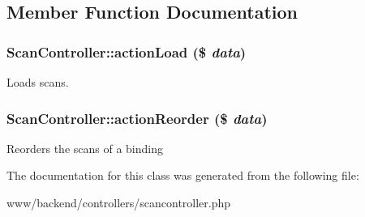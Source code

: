 \subsection{Member Function Documentation}
\hypertarget{classScanController_a5df6553a577a96b4afb65dd2f52464e9}{
\subsubsection[{actionLoad}]{\setlength{\rightskip}{0pt plus 5cm}ScanController::actionLoad (\$ {\em data})}}
\label{classScanController_a5df6553a577a96b4afb65dd2f52464e9}
Loads scans. \hypertarget{classScanController_a5e4ead751c616143ac51fd6dff807c24}{
\subsubsection[{actionReorder}]{\setlength{\rightskip}{0pt plus 5cm}ScanController::actionReorder (\$ {\em data})}}
\label{classScanController_a5e4ead751c616143ac51fd6dff807c24}
Reorders the scans of a binding 

The documentation for this class was generated from the following file:\begin{DoxyCompactItemize}
\item 
www/backend/controllers/scancontroller.php\end{DoxyCompactItemize}

